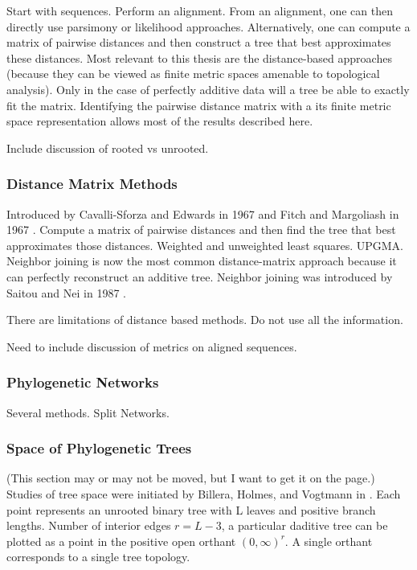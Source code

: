 Start with sequences.
Perform an alignment.
From an alignment, one can then directly use parsimony or likelihood approaches.
Alternatively, one can compute a matrix of pairwise distances and then construct a tree that best approximates these distances.
Most relevant to this thesis are the distance-based approaches (because they can be viewed as finite metric spaces amenable to topological analysis).
Only in the case of perfectly additive data will a tree be able to exactly fit the matrix.
Identifying the pairwise distance matrix with a its finite metric space representation allows most of the results described here.

Include discussion of rooted vs unrooted.

\subsubsection{Distance Matrix Methods}

Introduced by Cavalli-Sforza and Edwards in 1967 \cite{CavalliSforza:1967th} and Fitch and Margoliash in 1967 \cite{Fitch:1967we}.
Compute a matrix of pairwise distances and then find the tree that best approximates those distances.
Weighted and unweighted least squares.
UPGMA.
Neighbor joining is now the most common distance-matrix approach because it can perfectly reconstruct an additive tree.
Neighbor joining was introduced by Saitou and Nei in 1987 \cite{Saitou:1987wo}.

There are limitations of distance based methods.
Do not use all the information.

Need to include discussion of metrics on aligned sequences.

\subsubsection{Phylogenetic Networks}

Several methods.
Split Networks.

\subsubsection{Space of Phylogenetic Trees}

(This section may or may not be moved, but I want to get it on the page.)
Studies of tree space were initiated by Billera, Holmes, and Vogtmann in \cite{Billera:2001tv}.
Each point represents an unrooted binary tree with L leaves and positive branch lengths.
Number of interior edges $r=L-3$, a particular daditive tree can be plotted as a point in the positive open orthant $(0,\infty)^{r}$.
A single orthant corresponds to a single tree topology.

